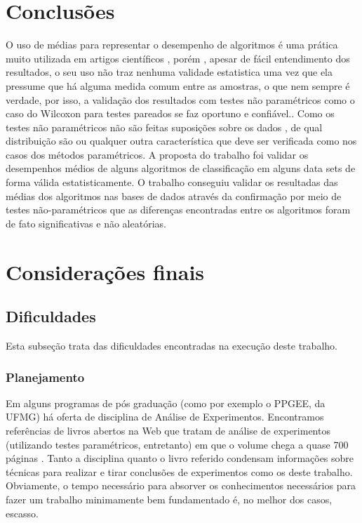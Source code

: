 \documentclass[11pt]{article}
\begin{document}
\section{Conclusões}

    O uso de médias para representar o desempenho de algoritmos é uma prática muito utilizada em artigos científicos , porém , apesar de fácil entendimento dos resultados, o seu uso não traz nenhuma validade estatistica uma vez que ela pressume que há alguma medida comum entre as amostras, o que nem sempre é verdade, por isso, a validação dos resultados com testes não paramétricos como o caso do Wilcoxon para testes pareados se faz oportuno e confiável.\cite{Salzberg1997}.   
    Como os testes não paramétricos não são feitas suposições sobre os dados , de qual distribuição são ou qualquer outra característica que deve ser verificada como nos casos dos métodos paramétricos.
    A proposta do trabalho foi validar os desempenhos médios de alguns algoritmos de classificação em alguns data sets de forma válida estatisticamente.
    O trabalho conseguiu validar os resultadas das médias dos algoritmos nas bases de dados através da confirmação por meio de testes não-paramétricos que as diferenças encontradas entre os algoritmos foram de fato significativas e não aleatórias.

\newpage
\section{Considerações finais}

\subsection{Dificuldades}
Esta subseção trata das dificuldades encontradas na execução deste trabalho.

\subsubsection{Planejamento}
Em alguns programas de pós graduação (como por exemplo o PPGEE, da UFMG) há oferta de disciplina de Análise de Experimentos. Encontramos referências de livros abertos na Web que tratam de análise de experimentos (utilizando testes paramétricos, entretanto) em que o volume chega a quase 700 páginas \cite{exp}. Tanto a disciplina quanto o livro referido condensam informações sobre técnicas para realizar e tirar conclusões de experimentos como os deste trabalho. Obviamente, o tempo necessário para absorver os conhecimentos necessários para fazer um trabalho minimamente bem fundamentado é, no melhor dos casos, escasso. 
\end{document}
